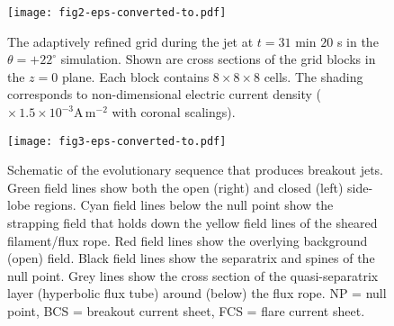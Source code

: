 \documentclass[twocolumn]{aastex6}
\begin{document}
\begin{figure}
\centering
\texttt{[image: fig2-eps-converted-to.pdf]}
\caption{The adaptively refined grid during the jet at $t = 31$ min $20$ s in the $\theta = +22^\circ$ simulation. Shown are cross sections of the grid blocks in the $z=0$ plane. Each block contains $8\times8\times8$ cells. The shading corresponds to non-dimensional electric current density ($\times \,1.5\times10^{-3} \text{A} \,\text{m}^{-2}$ with coronal scalings).}
\label{fig:grid}
\end{figure}

\begin{figure*}
\centering
\texttt{[image: fig3-eps-converted-to.pdf]}
\caption{Schematic of the evolutionary sequence that produces breakout jets. Green field lines show both the open (right) and closed (left) side-lobe regions. Cyan field lines below the null point show the strapping field that holds down the yellow field lines of the sheared filament/flux rope. Red field lines show the overlying background (open) field. Black field lines show the separatrix and spines of the null point. Grey lines show the cross section of the quasi-separatrix layer (hyperbolic flux tube) around (below) the flux rope. NP = null point, BCS = breakout current sheet, FCS = flare current sheet.}
\label{fig:fields}
\end{figure*}

\end{document}
